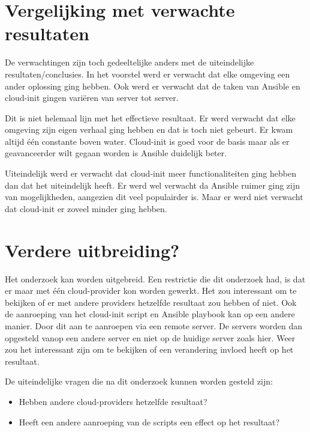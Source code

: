 \section{Vergelijking met verwachte resultaten}
De verwachtingen zijn toch gedeeltelijke anders met de uiteindelijke resultaten/conclusies. In het voorstel werd er verwacht dat elke omgeving een ander oplossing ging hebben. Ook werd er verwacht dat de taken van Ansible en cloud-init gingen variëren van server tot server.

Dit is niet helemaal lijn met het effectieve resultaat. Er werd verwacht dat elke omgeving zijn eigen verhaal ging hebben en dat is toch niet gebeurt. Er kwam altijd één constante boven water. Cloud-init is goed voor de basis maar als er geavanceerder wilt gegaan worden is Ansible duidelijk beter. 

Uiteindelijk werd er verwacht dat cloud-init meer functionaliteiten ging hebben dan dat het uiteindelijk heeft. Er werd wel verwacht da Ansible ruimer ging zijn van mogelijkheden, aangezien dit veel populairder is. Maar er werd niet verwacht dat cloud-init er zoveel minder ging hebben.


\section{Verdere uitbreiding?}
Het onderzoek kan worden uitgebreid. Een restrictie die dit onderzoek had, is dat er maar met één cloud-provider kon worden gewerkt. Het zou interessant om te bekijken of er met andere providers hetzelfde resultaat zou hebben of niet. Ook de aanroeping van het cloud-init script en Ansible playbook kan op een andere manier. Door dit aan te aanroepen via een remote server. De servers worden dan opgesteld vanop een andere server en niet op de huidige server zoals hier. Weer zou het interessant zijn om te bekijken of een verandering invloed heeft op het resultaat.

De uiteindelijke vragen die na dit onderzoek kunnen worden gesteld zijn:
\begin{itemize}
    \item Hebben andere cloud-providers hetzelfde resultaat? 
    \item Heeft een andere aanroeping van de scripts een effect op het resultaat?
\end{itemize}

